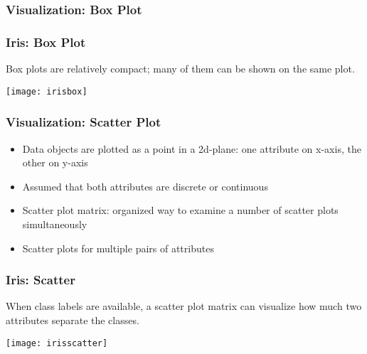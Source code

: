 \begin{frame}[fragile] \frametitle{Visualization: Box Plot}

\hfill
{}
\end{frame}

\begin{frame}[fragile] \frametitle{Iris: Box Plot}
Box plots are relatively compact; many of them can be shown on the same plot.

\begin{center}
\texttt{[image: irisbox]}
\end{center}

\end{frame}

\begin{frame}[fragile]\frametitle{Visualization: Scatter Plot}	
\begin{itemize}
\item Data objects are plotted as a point in a 2d-plane: one attribute on x-axis, the other on y-axis
\item Assumed that both attributes are discrete or continuous
\item Scatter plot matrix: organized way to examine a number of scatter plots simultaneously
\item Scatter plots for multiple pairs of attributes
\end{itemize}
\end{frame}

\begin{frame}[fragile] \frametitle{Iris: Scatter}
When class labels are available, a scatter plot matrix can visualize how much two attributes separate the classes.


\begin{center}
\texttt{[image: irisscatter]}
\end{center}

\end{frame}
